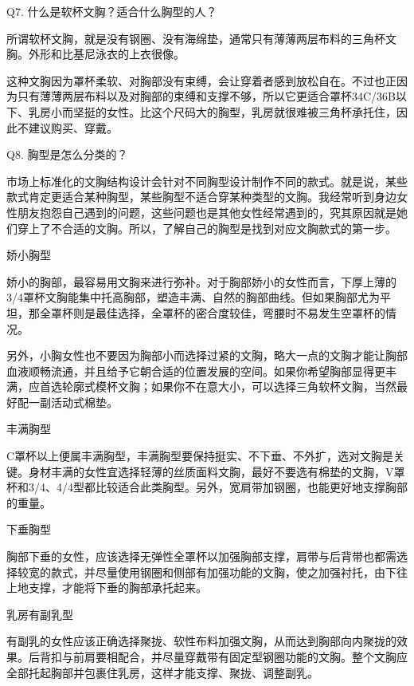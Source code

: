 \documentclass[12pt,UTF8]{ctexbook}
\begin{document}
Q7. 什么是软杯文胸？适合什么胸型的人？


所谓软杯文胸，就是没有钢圈、没有海绵垫，通常只有薄薄两层布料的三角杯文胸。外形和比基尼泳衣的上衣很像。

这种文胸因为罩杯柔软、对胸部没有束缚，会让穿着者感到放松自在。不过也正因为只有薄薄两层布料以及对胸部的束缚和支撑不够，所以它更适合罩杯34C/36B以下、乳房小而坚挺的女性。比这个尺码大的胸型，乳房就很难被三角杯承托住，因此不建议购买、穿戴。





Q8. 胸型是怎么分类的？


市场上标准化的文胸结构设计会针对不同胸型设计制作不同的款式。就是说，某些款式肯定更适合某种胸型，某些胸型不适合穿某种类型的文胸。我经常听到身边女性朋友抱怨自己遇到的问题，这些问题也是其他女性经常遇到的，究其原因就是她们穿上了不合适的文胸。所以，了解自己的胸型是找到对应文胸款式的第一步。

娇小胸型

娇小的胸部，最容易用文胸来进行弥补。对于胸部娇小的女性而言，下厚上薄的3/4罩杯文胸能集中托高胸部，塑造丰满、自然的胸部曲线。但如果胸部尤为平坦，那全罩杯则是最佳选择，全罩杯的密合度较佳，弯腰时不易发生空罩杯的情况。



另外，小胸女性也不要因为胸部小而选择过紧的文胸，略大一点的文胸才能让胸部血液顺畅流通，并且给予它朝合适的位置发展的空间。如果你希望胸部显得更丰满，应首选轮廓式模杯文胸；如果你不在意大小，可以选择三角软杯文胸，当然最好配一副活动式棉垫。

丰满胸型

C罩杯以上便属丰满胸型，丰满胸型要保持挺实、不下垂、不外扩，选对文胸是关键。身材丰满的女性宜选择轻薄的丝质面料文胸，最好不要选有棉垫的文胸，V罩杯和3/4、4/4型都比较适合此类胸型。另外，宽肩带加钢圈，也能更好地支撑胸部的重量。

下垂胸型

胸部下垂的女性，应该选择无弹性全罩杯以加强胸部支撑，肩带与后背带也都需选择较宽的款式，并尽量使用钢圈和侧部有加强功能的文胸，使之加强衬托，由下往上地支撑，才能将下垂的胸部承托起来。



乳房有副乳型

有副乳的女性应该正确选择聚拢、软性布料加强文胸，从而达到胸部向内聚拢的效果。后背扣与前肩要相配合，并尽量穿戴带有固定型钢圈功能的文胸。整个文胸应全部托起胸部并包裹住乳房，这样才能支撑、聚拢、调整副乳。
\end{document}
